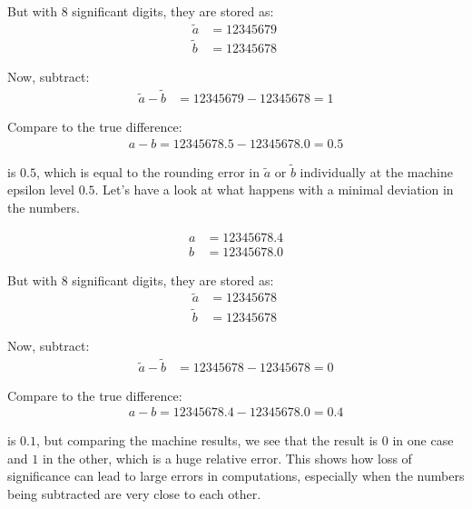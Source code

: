 But with 8 significant digits, they are stored as:
\begin{align*}
    \tilde{a} &= 12345679 \ \\
    \tilde{b} &= 12345678
\end{align*}

Now, subtract:
\begin{align*}
    \tilde{a} - \tilde{b} &= 12345679 - 12345678 = 1
\end{align*}

Compare to the true difference:
\begin{align*}
    a - b = 12345678.5 - 12345678.0 = 0.5
\end{align*}

 is $0.5$, which is equal to the rounding error in $\tilde{a}$ or $\tilde{b}$ individually at the machine epsilon level $0.5$.
Let's have a look at what happens with a minimal deviation in the numbers.

\begin{align*}
    a &= 12345678.4  \\
    b &= 12345678.0 
\end{align*}

But with 8 significant digits, they are stored as:
\begin{align*}
    \tilde{a} &= 12345678 \ \\
    \tilde{b} &= 12345678
\end{align*}

Now, subtract:
\begin{align*}
    \tilde{a} - \tilde{b} &= 12345678 - 12345678 = 0
\end{align*}

Compare to the true difference:
\begin{align*}
    a - b = 12345678.4 - 12345678.0 = 0.4
\end{align*}


 is $0.1$, but comparing the machine results, we see that the result is $0$ in one case and $1$ in the other,
which is a huge relative error. This shows how loss of significance can lead to large errors in computations, especially when the numbers being subtracted are very close to each other.


\vspace{2em}

